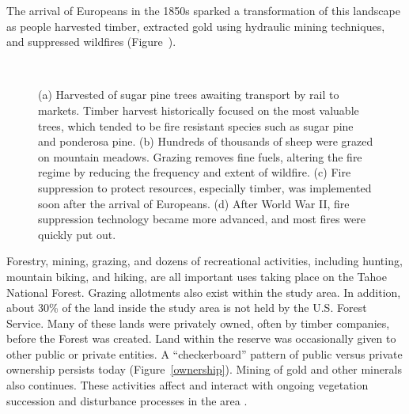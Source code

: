 The arrival of Europeans in the 1850s sparked a transformation of this landscape as people harvested timber, extracted gold using hydraulic mining techniques, and suppressed wildfires \citep{Storer1963} (Figure~). 
\begin{figure}[!htbp]
  \centering
   \\
   \caption{(a) Harvested of sugar pine trees awaiting transport by rail to markets. Timber harvest historically focused on the most valuable trees, which tended to be fire resistant species such as sugar pine and ponderosa pine. (b) Hundreds of thousands of sheep were grazed on mountain meadows. Grazing removes fine fuels, altering the fire regime by reducing the frequency and extent of wildfire. (c) Fire suppression to protect resources, especially timber, was implemented soon after the arrival of Europeans. (d) After World War II, fire suppression technology became more advanced, and most fires were quickly put out.} 
\label{figs:historicalphotos}
\end{figure}

Forestry, mining, grazing, and dozens of recreational activities, including hunting, mountain biking, and hiking, are all important uses taking place on the Tahoe National Forest. Grazing allotments also exist within the study area. In addition, 
about 30\% of the land inside the study area is not held by the U.S. Forest Service. Many of these lands were privately owned, often by timber companies, before the Forest was created. Land within the reserve was occasionally given to other public or private entities. A ``checkerboard'' pattern of public versus private ownership persists today (Figure~\ref{ownership}). Mining of gold and other minerals also continues. These activities affect and interact with ongoing vegetation succession and disturbance processes in the area \citep{USDAForestService2014}.

